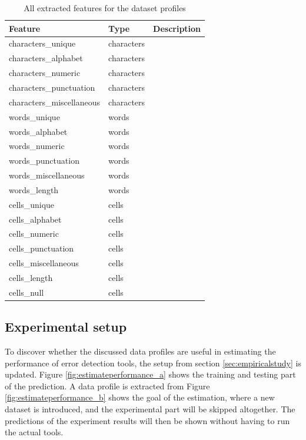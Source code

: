 \begin{table}[H]
\centering
	\begin{tabular}{lll}
		Feature                   & Type       & Description \\ \hline
		characters\_unique        & characters &             \\
		characters\_alphabet      & characters &             \\
		characters\_numeric       & characters &             \\
		characters\_punctuation   & characters &             \\
		characters\_miscellaneous & characters &             \\
		words\_unique             & words      &             \\
		words\_alphabet           & words      &             \\
		words\_numeric            & words      &             \\
		words\_punctuation        & words      &             \\
		words\_miscellaneous      & words      &             \\
		words\_length             & words      &             \\
		cells\_unique             & cells      &             \\
		cells\_alphabet           & cells      &             \\
		cells\_numeric            & cells      &             \\
		cells\_punctuation        & cells      &             \\
		cells\_miscellaneous      & cells      &             \\
		cells\_length             & cells      &             \\
		cells\_null               & cells      &             
	\end{tabular}
	\caption{All extracted features for the dataset profiles}
	\label{tab:profilefeatures}
\end{table}

\subsection{Experimental setup}
To discover whether the discussed data profiles are useful in estimating the performance of error detection tools, the setup from section \ref{sec:empiricalstudy} is updated. Figure \ref{fig:estimateperformance_a} shows the training and testing part of the prediction. A data profile is extracted from 
Figure \ref{fig:estimateperformance_b} shows the goal of the estimation, where a new dataset is introduced, and the experimental part will be skipped altogether. The predictions of the experiment results will then be shown without having to run the actual tools.


